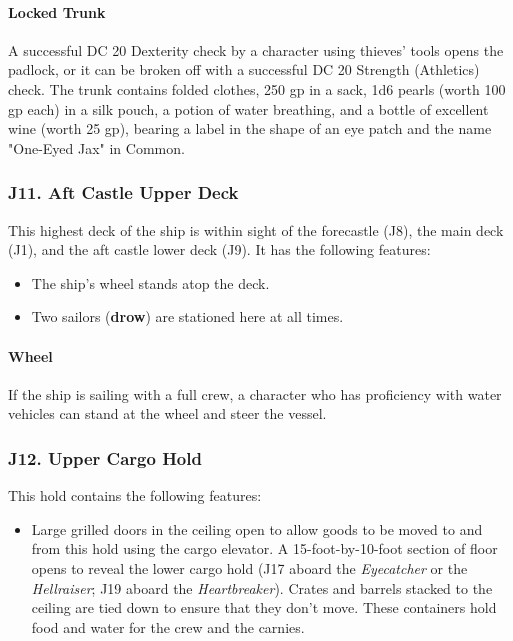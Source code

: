 \documentclass[10pt,a4paper,twoside,twocolumn,openany,nodeprecatedcode]{dndbook}
\begin{document}
\paragraph{Locked Trunk}
A successful DC 20 Dexterity check by a character using thieves' tools opens the padlock, or it can be broken off with a successful DC 20 Strength (Athletics) check. The trunk contains folded clothes, 250 gp in a sack, 1d6 pearls (worth 100 gp each) in a silk pouch, a potion of water breathing, and a bottle of excellent wine (worth 25 gp), bearing a label in the shape of an eye patch and the name "One-Eyed Jax" in Common.
\subsubsection{J11. Aft Castle Upper Deck}
This highest deck of the ship is within sight of the forecastle (J8), the main deck (J1), and the aft castle lower deck (J9). It has the following features:
\begin{itemize}

\item The ship's wheel stands atop the deck.
\item Two sailors (\textbf{drow}) are stationed here at all times.
\end{itemize}


\paragraph{Wheel}
If the ship is sailing with a full crew, a character who has proficiency with water vehicles can stand at the wheel and steer the vessel.
\subsubsection{J12. Upper Cargo Hold}
This hold contains the following features:
\begin{itemize}

\item Large grilled doors in the ceiling open to allow goods to be moved to and from this hold using the cargo elevator. A 15-foot-by-10-foot section of floor opens to reveal the lower cargo hold (J17 aboard the \textit{Eyecatcher} or the \textit{Hellraiser}; J19 aboard the \textit{Heartbreaker}). Crates and barrels stacked to the ceiling are tied down to ensure that they don't move. These containers hold food and water for the crew and the carnies.
\end{itemize}
\end{document}
